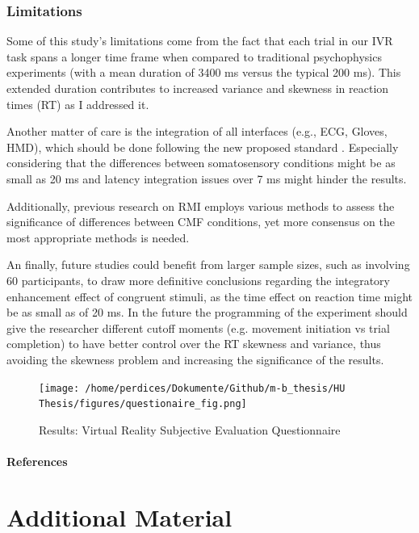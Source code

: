 \documentclass[12pt,oneside,openright]{report}
\begin{document}
\subsubsection*{Limitations}

Some of this study's limitations come from the fact that each trial in our IVR task spans a longer time frame when compared to traditional psychophysics experiments (with a mean duration of 3400 ms versus the typical 200 ms). This extended duration contributes to increased variance and skewness in reaction times (RT) as I addressed it. 

Another matter of care is the integration of all interfaces (e.g., ECG, Gloves, HMD), which should be done following the new proposed standard \parencite{vr_respont}. Especially considering that the differences between somatosensory conditions might be as small as 20 ms and latency integration issues over 7 ms might hinder the results. 

Additionally, previous research on RMI employs various methods to assess the significance of differences between CMF conditions, yet more consensus on the most appropriate methods is needed. 

An finally, future studies could benefit from larger sample sizes, such as involving 60 participants, to draw more definitive conclusions regarding the integratory enhancement effect of congruent stimuli, as the time effect on reaction time might be as small as of 20 ms. In the future the programming of the experiment should give the researcher different cutoff moments (e.g. movement initiation vs trial completion) to have better control over the RT skewness and variance, thus avoiding the skewness problem and increasing the significance of the results.


\newpage
\begin{figure}[ht]
        \centering
        \texttt{[image: /home/perdices/Dokumente/Github/m-b\_thesis/HU Thesis/figures/questionaire\_fig.png]}
        \caption{Results: Virtual Reality Subjective Evaluation Questionnaire}
        \label{fig:quest}
\end{figure}
\pagebreak



\paragraph{\textbf{References}}
\printbibliography[heading=none]


\pagebreak
\vspace*{\fill}
\section*{\centering Additional Material}
\vspace*{\fill}
\end{document}
